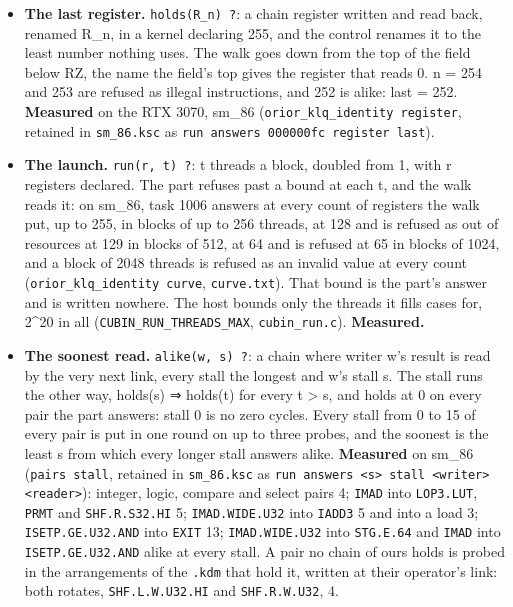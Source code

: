 \begin{itemize}
\item \textbf{The last register.} \texttt{holds(R\_\allowbreak{}n) ?}: a chain register written and read back, renamed R\_\allowbreak{}n, in a kernel declaring 255, and the control renames it to the least number nothing uses. The walk goes down from the top of the field below RZ, the name the field's top gives the register that reads 0. n = 254 and 253 are refused as illegal instructions, and 252 is alike: last = 252. \textbf{Measured} on the RTX 3070, sm\_\allowbreak{}86 (\texttt{orior\_\allowbreak{}klq\_\allowbreak{}identity register}, retained in \texttt{sm\_\allowbreak{}86.\allowbreak{}ksc} as \texttt{run answers 000000fc register last}).
\item \textbf{The launch.} \texttt{run(r, t) ?}: t threads a block, doubled from 1, with r registers declared. The part refuses past a bound at each t, and the walk reads it: on sm\_\allowbreak{}86, task 1006 answers at every count of registers the walk put, up to 255, in blocks of up to 256 threads, at 128 and is refused as out of resources at 129 in blocks of 512, at 64 and is refused at 65 in blocks of 1024, and a block of 2048 threads is refused as an invalid value at every count (\texttt{orior\_\allowbreak{}klq\_\allowbreak{}identity curve}, \texttt{curve.\allowbreak{}txt}). That bound is the part's answer and is written nowhere. The host bounds only the threads it fills cases for, 2\textasciicircum{}20 in all (\texttt{CUBIN\_\allowbreak{}RUN\_\allowbreak{}THREADS\_\allowbreak{}MAX}, \texttt{cubin\_\allowbreak{}run.\allowbreak{}c}). \textbf{Measured.}
\item \textbf{The soonest read.} \texttt{alike(w, s) ?}: a chain where writer w's result is read by the very next link, every stall the longest and w's stall s. The stall runs the other way, holds(s) ⇒ holds(t) for every t > s, and holds at 0 on every pair the part answers: stall 0 is no zero cycles. Every stall from 0 to 15 of every pair is put in one round on up to three probes, and the soonest is the least s from which every longer stall answers alike. \textbf{Measured} on sm\_\allowbreak{}86 (\texttt{pairs stall}, retained in \texttt{sm\_\allowbreak{}86.\allowbreak{}ksc} as \texttt{run answers <s> stall <writer> <reader>}): integer, logic, compare and select pairs 4; \texttt{IMAD} into \texttt{LOP3.\allowbreak{}LUT}, \texttt{PRMT} and \texttt{SHF.\allowbreak{}R.\allowbreak{}S32.\allowbreak{}HI} 5; \texttt{IMAD.\allowbreak{}WIDE.\allowbreak{}U32} into \texttt{IADD3} 5 and into a load 3; \texttt{ISETP.\allowbreak{}GE.\allowbreak{}U32.\allowbreak{}AND} into \texttt{EXIT} 13; \texttt{IMAD.\allowbreak{}WIDE.\allowbreak{}U32} into \texttt{STG.\allowbreak{}E.\allowbreak{}64} and \texttt{IMAD} into \texttt{ISETP.\allowbreak{}GE.\allowbreak{}U32.\allowbreak{}AND} alike at every stall. A pair no chain of ours holds is probed in the arrangements of the \texttt{.\allowbreak{}kdm} that hold it, written at their operator's link: both rotates, \texttt{SHF.\allowbreak{}L.\allowbreak{}W.\allowbreak{}U32.\allowbreak{}HI} and \texttt{SHF.\allowbreak{}R.\allowbreak{}W.\allowbreak{}U32}, 4.

\end{itemize}
